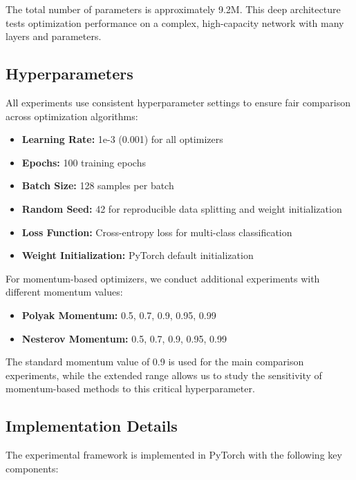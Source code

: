 \documentclass[12pt]{article}
\begin{document}
The total number of parameters is approximately 9.2M. This deep architecture tests optimization performance on a complex, high-capacity network with many layers and parameters.

\subsection{Hyperparameters}

All experiments use consistent hyperparameter settings to ensure fair comparison across optimization algorithms:

\begin{itemize}
    \item \textbf{Learning Rate:} 1e-3 (0.001) for all optimizers
    \item \textbf{Epochs:} 100 training epochs
    \item \textbf{Batch Size:} 128 samples per batch
    \item \textbf{Random Seed:} 42 for reproducible data splitting and weight initialization
    \item \textbf{Loss Function:} Cross-entropy loss for multi-class classification
    \item \textbf{Weight Initialization:} PyTorch default initialization
\end{itemize}

For momentum-based optimizers, we conduct additional experiments with different momentum values:
\begin{itemize}
    \item \textbf{Polyak Momentum:} 0.5, 0.7, 0.9, 0.95, 0.99
    \item \textbf{Nesterov Momentum:} 0.5, 0.7, 0.9, 0.95, 0.99
\end{itemize}

The standard momentum value of 0.9 is used for the main comparison experiments, while the extended range allows us to study the sensitivity of momentum-based methods to this critical hyperparameter.

\subsection{Implementation Details}

The experimental framework is implemented in PyTorch with the following key components:
\end{document}
